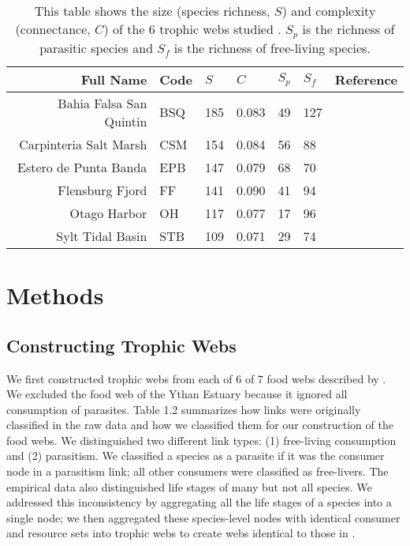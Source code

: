 \documentclass[../dissertation.tex]{subfiles}
\begin{document}
 \begin{table}
    \centering
    \begin{tabular}{r l l l l l l }
        \toprule
        Full Name               &Code       &$S$    &$C$    &$S_p$  &$S_f$  &Reference\\
        \midrule 
        Bahia Falsa San Quintin &BSQ        &185    &0.083  &49
                                &127&\cite{Hechinger2011a}\\
        Carpinteria Salt Marsh  &CSM        &154    &0.084  &56     &88
                                &\cite{Hechinger2011a}\\
        Estero de Punta Banda   &EPB        &147    &0.079  &68     &70
                                &\cite{Hechinger2011a}\\
        Flensburg Fjord         &FF         &141    &0.090  &41     &94 &\cite{Zander2011}\\
        Otago Harbor            &OH         &117    &0.077  &17     &96&\cite{Mouritsen2011}\\
        Sylt Tidal Basin        &STB        &109    &0.071  &29     &74&\cite{Thieltges2011}\\
        \bottomrule
    \end{tabular}
    \caption{This table shows the size (species richness, $S$) and complexity
        (connectance, $C$) of the 6 trophic webs studied \cite{Dunne2013}. $S_p$ is the richness of
    parasitic species and $S_f$ is the richness of free-living species.
    \label{tab:foodWebSummary}}
\end{table}


\section{Methods} 

\subsection{Constructing Trophic Webs} We first constructed trophic webs from
each of 6 of 7 food webs described by \cite{Dunne2013}. We excluded the food
web of the Ythan Estuary because it ignored all consumption of parasites. Table
1.2 summarizes how links were originally classified in the raw data and how we
classified them for our construction of the food webs. We distinguished two
different link types: (1) free-living consumption and (2) parasitism. We
classified a species as a parasite if it was the consumer node in a parasitism
link; all other consumers were classified as free-livers. The empirical data
also distinguished life stages of many but not all species. We addressed this
inconsistency by aggregating all the life stages of a species into a single
node; we then aggregated these species-level nodes with identical consumer and
resource sets into trophic webs to create webs identical to those in
\cite{Dunne2013}. 
\end{document}

